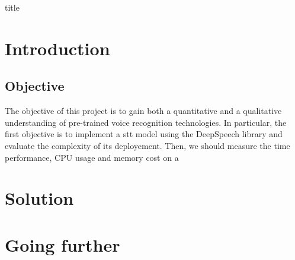 \documentclass[12pt]{article}
\begin{document}
{title}

\tableofcontents


\section{Introduction}
\subsection{Objective}
The objective of this project is to gain both a quantitative and a qualitative understanding of pre-trained voice recognition technologies. In particular, the first objective is to implement a \gls{stt} model using the DeepSpeech library and evaluate the complexity of its deployement. Then, we should measure the time performance, CPU usage and memory cost on a 


\section{Solution}
\section{Going further}


\end{document}
